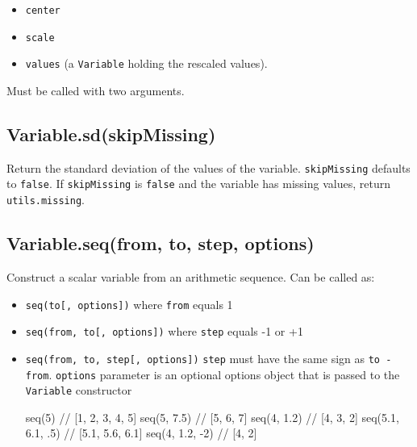 \documentclass{article}
\begin{document}
\begin{itemize}

\item \texttt{center}

\item \texttt{scale}

\item \texttt{values} (a \texttt{Variable} holding the rescaled values).

\end{itemize}

Must be called with two arguments.


    \subsection*{Variable.sd(skipMissing)}
    Return the standard deviation of the values of the variable.
\texttt{skipMissing} defaults to \texttt{false}.  If \texttt{skipMissing} is \texttt{false} and
the variable has missing values, return \texttt{utils.missing}.


    \subsection*{Variable.seq(from, to, step, options)}
    Construct a scalar variable from an arithmetic sequence.
Can be called as:


\begin{itemize}

\item \texttt{seq(to[, options])} where \texttt{from} equals 1

\item \texttt{seq(from, to[, options])} where \texttt{step} equals -1 or +1

\item \texttt{seq(from, to, step[, options])}
\texttt{step} must have the same sign as \texttt{to - from}.
\texttt{options} parameter is an optional options object that is passed to the
\texttt{Variable} constructor


  seq(5)            // [1, 2, 3, 4, 5]
  seq(5, 7.5)       // [5, 6, 7]
  seq(4, 1.2)       // [4, 3, 2]
  seq(5.1, 6.1, .5) // [5.1, 5.6, 6.1]
  seq(4, 1.2, -2)   // [4, 2]




\end{itemize}
\end{document}
